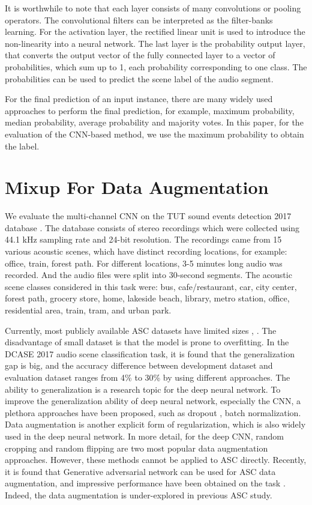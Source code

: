 \documentclass[conference]{IEEEtran}
\begin{document}
It is worthwhile to note that each layer consists of many convolutions or pooling operators. The convolutional filters can be interpreted as the filter-banks learning. For the activation layer, the rectified linear unit is used to introduce the non-linearity into a neural network. The last layer is the probability output layer, that converts the output vector of the fully connected layer to a vector of probabilities, which sum up to 1, each probability corresponding to one class. The probabilities can be used to predict the scene label of the audio segment.

For the final prediction of an input instance, there are many widely used approaches to perform the final prediction, for example, maximum probability, median probability, average probability and majority votes. In this paper, for the evaluation of the CNN-based method, we use the maximum probability to obtain the label.

\section{Mixup For Data Augmentation}

We evaluate the multi-channel CNN on the TUT sound events detection 2017 database \cite{b7}. The database consists of stereo recordings which were collected using 44.1 kHz sampling rate and 24-bit resolution. The recordings came from 15 various acoustic scenes, which have distinct recording locations, for example: office, train, forest path. For different locations, 3-5 minutes long audio was recorded. And the audio files were split into 30-second segments. The acoustic scene classes considered in this task were: bus, cafe/restaurant, car, city center, forest path, grocery store, home, lakeside beach, library, metro station, office, residential area, train, tram, and urban park.

Currently, most publicly available ASC datasets have limited sizes \cite{b3}, \cite{b7}. The disadvantage of small dataset is that the model is prone to overfitting. In the DCASE 2017 audio scene classification task, it is found that the generalization gap is big, and the accuracy difference between development dataset and evaluation dataset ranges from 4\% to 30\% by using different approaches. The ability to generalization is a research topic for the deep neural network. To improve the generalization ability of deep neural network, especially the CNN, a plethora approaches have been proposed, such as dropout \cite{b26}, batch normalization\cite{b27}. Data augmentation is another explicit form of regularization, which is also widely used in the deep neural network. In more detail, for the deep CNN, random cropping and random flipping are two most popular data augmentation approaches. However, these methods cannot be applied to ASC directly. Recently, it is found that Generative adversarial network can be used for ASC data augmentation, and impressive performance have been obtained on the task \cite{b28}. Indeed, the data augmentation is under-explored in previous ASC study.
\end{document}
